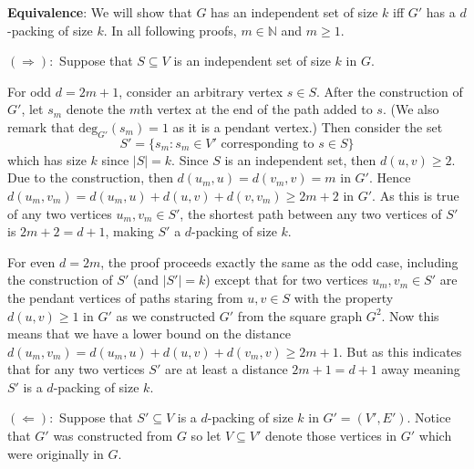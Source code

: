 \documentclass[10pt, a4paper]{article}
\theoremstyle{definition}
\newcommand{\N}{\mathbb{N}}
\begin{document}
\textbf{Equivalence}: We will show that $G$ has an independent set of size $k$ iff $G'$ has a $d$-packing of size $k$.  In all following proofs, $m \in \N$ and $m \geq 1$.

$(\Rightarrow):$ Suppose that $S \subseteq V$ is an independent set of size $k$ in $G$.

For odd $d = 2m+1$, consider an arbitrary vertex $s \in S$. After the construction of $G'$, let $s_m$ denote the $m$th vertex at the end of the path added to $s$. (We also remark that $\mathrm{deg}_{G'}(s_m) = 1$ as it is a pendant vertex.) Then consider the set
\[ S' = \{ s_m : s_m \in V' \text{ corresponding to } s \in S \}\]
which has size $k$ since $|S| = k$.
Since $S$ is an independent set, then $d(u,v) \geq 2$. Due to the construction, then $d(u_m,u) = d(v_m,v) = m$ in $G'$. Hence $d(u_m,v_m) = d(u_m,u) + d(u,v) + d(v,v_m) \geq 2m + 2$ in $G'$. As this is true of any two vertices $u_m, v_m \in S'$, the shortest path between any two vertices of $S'$ is $2m+2 = d+ 1$, making $S'$ a $d$-packing of size $k$.

For even $d = 2m$, the proof proceeds exactly the same as the odd case, including the construction of $S'$ (and $|S'| = k$) except that for two vertices $u_m, v_m \in S'$ are the pendant vertices of paths staring from $u, v \in S$ with the property $d(u,v) \geq 1$ in $G'$ as we constructed $G'$ from the square graph $G^2$. Now this means that we have a lower bound on the distance $d(u_m,v_m) = d(u_m,u) + d(u,v) + d(v_m,v) \geq 2m + 1$. But as this indicates that for any two vertices $S'$ are at least a distance $2m + 1 = d+1$ away meaning $S'$ is a $d$-packing of size $k$.

$(\Leftarrow):$ Suppose that $S' \subseteq V$ is a $d$-packing of size $k$ in $G' = (V', E')$. Notice that $G'$ was constructed from $G$ so let $V \subseteq V'$ denote those vertices in $G'$ which were originally in $G$.
\end{document}
